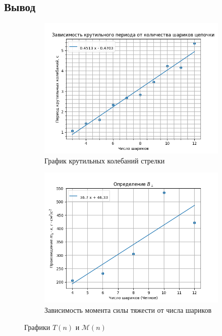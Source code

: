 \documentclass[a4paper, 12pt]{article}
\begin{document}
\begin{enumerate}
    \section*{Вывод}
    \begin{figure}[htbp]
        \centering
        \begin{subfigure}{0.7\textwidth}
            \centering
            \includegraphics[width=\linewidth]{period.png}
            \caption{График крутильных колебаний стрелки}
            \label{горизонтальная составляющая}
        \end{subfigure}
        \hfill
        \begin{subfigure}{0.7\textwidth}
            \centering
            \includegraphics[width=\linewidth]{vertical.png}
            \caption{Зависимость момента силы тяжести от числа шариков}
            \label{вертикальная составляющая}
        \end{subfigure}
        \caption{Графики $T(n)$ и $\mathcal{M}(n)$}
        \label{графики моментов и периодов}
    \end{figure}
\end{enumerate}
\end{document}

